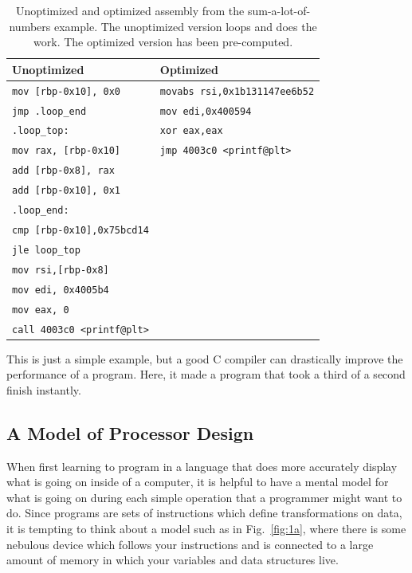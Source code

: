 \begin{table}[h]
	\centering
\begin{tabular}{l | l}
	\hline
	\textbf{Unoptimized} & \textbf{Optimized}\\
	\hline
	\texttt{mov [rbp-0x10], 0x0}	&\texttt{movabs rsi,0x1b131147ee6b52} \\
	\texttt{jmp .loop\_end			}	&\texttt{mov edi,0x400594} \\
	\texttt{.loop\_top:                } &\texttt{xor eax,eax   } \\
	\texttt{mov rax, [rbp-0x10]				}	&\texttt{jmp 4003c0 <printf@plt>}\\
	\texttt{add [rbp-0x8], rax				}	&\texttt{	} \\
	\texttt{add [rbp-0x10], 0x1				}	&\texttt{ }\\	
	\texttt{.loop\_end:                       } &\texttt{} \\
	\texttt{cmp [rbp-0x10],0x75bcd14} &\texttt{} \\
	\texttt{jle loop\_top} &\texttt{} \\
	\texttt{mov rsi,[rbp-0x8]} &\texttt{} \\
	\texttt{mov edi, 0x4005b4} &\texttt{} \\
	\texttt{mov eax, 0} &\texttt{} \\
	\texttt{call 4003c0 <printf@plt>} &\texttt{} \\
\end{tabular}
	\caption[Unoptimized and optimized assembly from the sum-a-lot-of-numbers example.]{Unoptimized and optimized assembly from the sum-a-lot-of-numbers example. The unoptimized version loops and does the work. The optimized version has been pre-computed.}
	\label{table:assem-1}
\end{table}

This is just a simple example, but a good C compiler can drastically improve the performance of a
program. Here, it made a program that took a third of a second finish instantly.

\subsection{A Model of Processor Design}

When first learning to program in a language that does more accurately display what is going on
inside of a computer, it is helpful to have a mental model for what is going on during each
simple operation that a programmer might want to do. Since programs are sets of instructions
which define transformations on data, it is tempting to think about a model such as in Fig.~\ref{fig:1a},
where there is some nebulous device which follows your instructions and is connected to a large amount
of memory in which your variables and data structures live.

